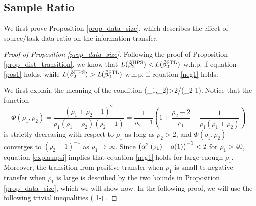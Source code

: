 \subsection{Sample Ratio} \label{app_proof_32}
We first prove Proposition \ref{prop_data_size}, which describes the effect of source/task data ratio on the information transfer. 

\begin{proof}[Proof of Proposition \ref{prop_data_size}]
Following the proof of Proposition \ref{prop_dist_transition}, we know that $L(\hat{\beta}_2^{\textup{HPS}})< L(\hat{\beta}_2^{\textup{STL}})$ w.h.p. if equation \eqref{pos1} holds, while $L(\hat{\beta}_2^{\textup{HPS}})>L(\hat{\beta}_2^{\textup{STL}})$ w.h.p. if equation \eqref{neg1} holds. 

We first explain the meaning of the condition 
\be\label{explainpsi}\Psi(\beta_1,\beta_2)>2/(\rho_2-1).\ee 
Notice that the function
$$ \Phi(\rho_1, \rho_2)=\frac{(\rho_1 + \rho_2 - 1)^2}{\rho_1 (\rho_1 + \rho_2) (\rho_2 - 1)}=\frac{1}{\rho_2-1} \left(1 +\frac{\rho_2-2}{\rho_1}+\frac{1}{\rho_1(\rho_1+\rho_2)}\right)$$
is strictly decreasing with respect to $\rho_1$ as long as $\rho_2> 2$, and $ \Phi(\rho_1, \rho_2)$ converges to $(\rho_2-1)^{-1}$ as $\rho_1\to \infty$. Since $\left( \alpha_-^2(\rho_1) -  \operatorname{o}(1) \right)^{-1} < 2$ for $\rho_1>40$,  equation \eqref{explainpsi} implies that equation \eqref{neg1} holds for large enough $\rho_1$. Moreover, the transition from positive transfer when $\rho_1$ is small to negative transfer when $\rho_1$ is large is described by the two bounds in Proposition \ref{prop_data_size}, which we will show now. 
In the following proof, we will use the following trivial inequalities 
\be\label{trivialphi}
\cdot \left( 1-\right) \le  {} \le  {}.
\ee


\end{proof}
